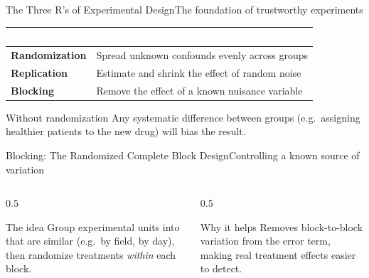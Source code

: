 \documentclass[aspectratio=169,11pt]{beamer}
\begin{document}
\begin{frame}{The Three R's of Experimental Design}{The foundation of trustworthy experiments}
  \small
  \renewcommand{\arraystretch}{1.35}
  \begin{center}
  \begin{tabularx}{\textwidth}{@{}>{\bfseries}l >{\raggedright\arraybackslash}X@{}}
    \toprule
    \rowcolor{PrimaryDark}
    \textcolor{white}{Principle} & \textcolor{white}{Purpose} \\
    \midrule
    Randomization & Spread unknown confounds evenly across groups \\
    \rowcolor{PrimaryLight!25}
    Replication & Estimate and shrink the effect of random noise \\
    Blocking & Remove the effect of a known nuisance variable \\
    \bottomrule
  \end{tabularx}
  \end{center}
  \begin{alertblock}{Without randomization}
    \small Any systematic difference between groups (e.g.\ assigning
    healthier patients to the new drug) will bias the result.
  \end{alertblock}
\end{frame}

\begin{frame}{Blocking: The Randomized Complete Block Design}{Controlling a known source of variation}
  \begin{columns}[T]
    \begin{column}{0.5\textwidth}
      \begin{block}{The idea}
        \small Group experimental units into  that are
        similar (e.g.\ by field, by day), then randomize treatments
        \emph{within} each block.
      \end{block}
    \end{column}
    \begin{column}{0.5\textwidth}
      \begin{exampleblock}{Why it helps}
        \small Removes block-to-block variation from the error term,
        making real treatment effects easier to detect.
      \end{exampleblock}
    \end{column}
  \end{columns}
\end{frame}
\end{document}
